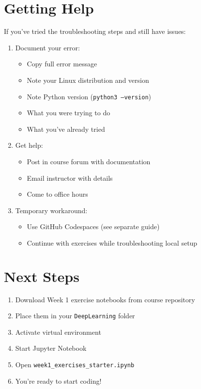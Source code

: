 \documentclass[11pt,a4paper]{article}
\begin{document}
\section{Getting Help}

If you've tried the troubleshooting steps and still have issues:

\begin{enumerate}
    \item Document your error:
    \begin{itemize}
        \item Copy full error message
        \item Note your Linux distribution and version
        \item Note Python version (\texttt{python3 --version})
        \item What you were trying to do
        \item What you've already tried
    \end{itemize}
    
    \item Get help:
    \begin{itemize}
        \item Post in course forum with documentation
        \item Email instructor with details
        \item Come to office hours
    \end{itemize}
    
    \item Temporary workaround:
    \begin{itemize}
        \item Use GitHub Codespaces (see separate guide)
        \item Continue with exercises while troubleshooting local setup
    \end{itemize}
\end{enumerate}

\section{Next Steps}

\begin{enumerate}
    \item Download Week 1 exercise notebooks from course repository
    \item Place them in your \texttt{DeepLearning} folder
    \item Activate virtual environment
    \item Start Jupyter Notebook
    \item Open \texttt{week1\_exercises\_starter.ipynb}
    \item You're ready to start coding!
\end{enumerate}
\end{document}
